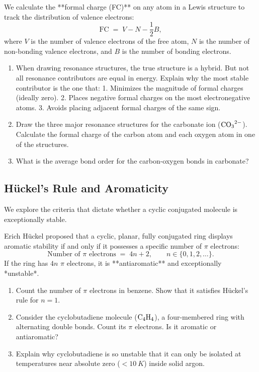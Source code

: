 \documentclass[12pt, a4paper]{book}
\begin{document}
\begin{explobox}
We calculate the **formal charge (FC)** on any atom in a Lewis structure to track the distribution of valence electrons:
\[
  \text{FC} \;=\; V - N - \frac{1}{2} B,
\]
where $V$ is the number of valence electrons of the free atom, $N$ is the number of non-bonding valence electrons, and $B$ is the number of bonding electrons.
\begin{enumerate}[label=(\alph*), leftmargin=*]
  \item When drawing resonance structures, the true structure is a hybrid. But not all resonance contributors are equal in energy.
        Explain why the most stable contributor is the one that:
        1. Minimizes the magnitude of formal charges (ideally zero).
        2. Places negative formal charges on the most electronegative atoms.
        3. Avoids placing adjacent formal charges of the same sign.
  \item Draw the three major resonance structures for the carbonate ion ($\ce{CO3^2-}$). Calculate the formal charge of the carbon atom and each oxygen atom in one of the structures.
  \item What is the average bond order for the carbon-oxygen bonds in carbonate?
\end{enumerate}
\end{explobox}

\subsection{Hückel's Rule and Aromaticity}

We explore the criteria that dictate whether a cyclic conjugated molecule is exceptionally stable.

\begin{explobox}
Erich Hückel proposed that a cyclic, planar, fully conjugated ring displays aromatic stability if and only if it possesses a specific number of $\pi$ electrons:
\[
  \text{Number of } \pi \text{ electrons} \;=\; 4n + 2, \qquad n \in \{0, 1, 2, \dots\}.
\]
If the ring has $4n$ $\pi$ electrons, it is **antiaromatic** and exceptionally *unstable*.
\begin{enumerate}[label=(\alph*), leftmargin=*]
  \item Count the number of $\pi$ electrons in benzene. Show that it satisfies Hückel's rule for $n=1$.
  \item Consider the cyclobutadiene molecule ($\ce{C4H4}$), a four-membered ring with alternating double bonds. Count its $\pi$ electrons. Is it aromatic or antiaromatic?
  \item Explain why cyclobutadiene is so unstable that it can only be isolated at temperatures near absolute zero ($<\SI{10}{K}$) inside solid argon.
\end{enumerate}
\end{explobox}
\end{document}
